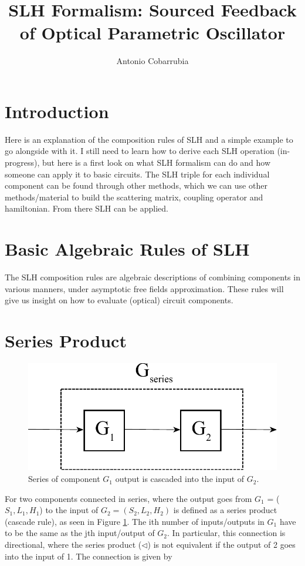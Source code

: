 \documentclass[a4paper]{article}
\title{SLH Formalism: Sourced Feedback of Optical Parametric Oscillator}
\author[1]{Antonio Cobarrubia}
\affil[1]{Department of Physics, San Diego State University, San Diego, CA 92182}
\date{}
\begin{document}
\maketitle

\doublespacing
\section{Introduction}
Here is an explanation of the composition rules of SLH and a simple example to go alongside with it. I still need to learn how to derive each SLH operation (in-progress), but here is a first look on what SLH formalism can do and how someone can apply it to basic circuits. The SLH triple for each individual component can be found through other methods, which we can use other methods/material to build the scattering matrix, coupling operator and hamiltonian. From there SLH can be applied. 

\section{Basic Algebraic Rules of SLH}
The SLH composition rules are algebraic descriptions of combining components in various manners, under asymptotic free fields approximation. These rules will give us insight on how to evaluate (optical) circuit components. 
\section*{Series Product} 

\begin{figure}[H]
\centering
\includegraphics[width = 7.5 cm]{Series_Product.pdf}
\caption{Series of component $G_1$ output is cascaded into the input of $G_2$.
}
\label{fig:series}
\end{figure}  

For two components connected in series, where the output goes from $G_1$ = ($S_1,L_1,H_1$) to the input of $G_2 = (S_2, L_2, H_2)$ is defined as a series product (cascade rule), as seen in Figure \ref{fig:series}. The ith number of inputs/outputs in $G_1$ have to be the same as the jth input/output of $G_2$. In particular, this connection is directional, where the series product ($\triangleleft $) is not equivalent if the output of 2 goes into the input of 1. The connection is given by 
\end{document}

